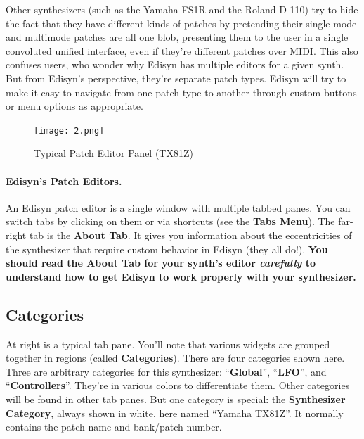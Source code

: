 \documentclass{article}
\begin{document}
Other synthesizers (such as the Yamaha FS1R and the Roland D-110) try to hide the fact that they have different kinds of patches by pretending their single-mode and multimode patches are all one blob, presenting them to the user in a single convoluted unified interface, even if they're different patches over MIDI. This also confuses users, who wonder why Edisyn has multiple editors for a given synth.  But from Edisyn's perspective, they're separate patch types.  Edisyn will try to make it easy to navigate from one patch type to another through custom buttons or menu options as appropriate.

\begin{figure}
\vspace{-2em}\texttt{[image: 2.png]}
\vspace{-3em}\caption{Typical Patch Editor Panel (TX81Z)}\label{typicalpatcheditorpanel}
\vspace{-2em}
\end{figure}

\paragraph{Edisyn's Patch Editors.}  An Edisyn patch editor is a single window with multiple tabbed panes.  You can switch tabs by clicking on them or via shortcuts (see the {\bf Tabs Menu}).  The far-right tab is the {\bf About Tab}.  It gives you information about the eccentricities of the synthesizer that require custom behavior in Edisyn (they all do!).  {\bf \color{red} You should read the About Tab for your synth's editor \textit{carefully} to understand how to get Edisyn to work properly with your synthesizer.}


\subsection{Categories}
At right is a typical tab pane.  You'll note that various widgets are grouped together in regions (called {\bf Categories}).  There are four categories shown here.  Three are arbitrary categories for this synthesizer: ``{\bf {\color{limegreen}Global}}'', ``{\bf {\color{hanpurple}LFO}}'', and ``{\bf {\color{goldenrod}Controllers}}''.  They're in various colors to differentiate them.  Other categories will be found in other tab panes.  But one category is special: the {\bf Synthesizer Category}, always shown in white, here named ``Yamaha TX81Z''.  It normally contains the patch name and bank/patch number.
\end{document}
